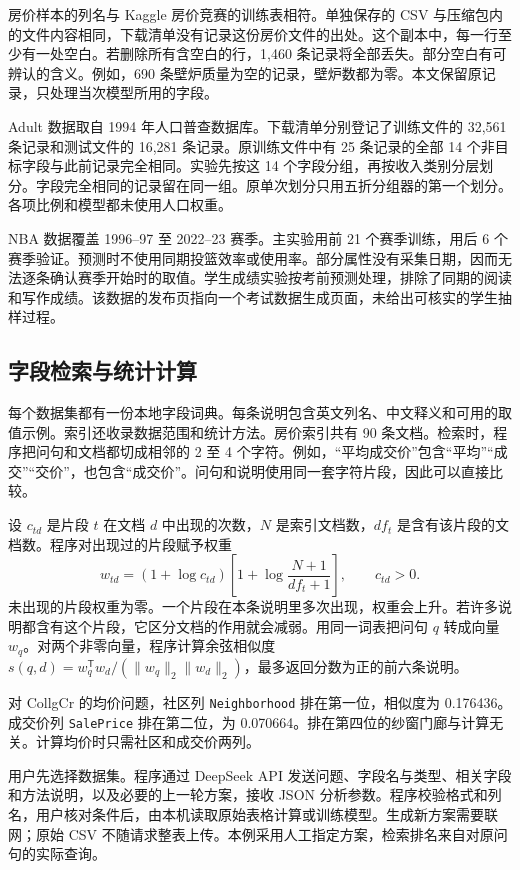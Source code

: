 \documentclass[12pt,journal,onecolumn,a4paper]{IEEEtran}
\newcommand{\field}[1]{\texttt{#1}}
\begin{document}
房价样本的列名与 Kaggle 房价竞赛的训练表相符\citep{house}。单独保存的 CSV 与压缩包内的文件内容相同，下载清单没有记录这份房价文件的出处。这个副本中，每一行至少有一处空白。若删除所有含空白的行，1,460 条记录将全部丢失。部分空白有可辨认的含义。例如，690 条壁炉质量为空的记录，壁炉数都为零。本文保留原记录，只处理当次模型所用的字段。

Adult 数据取自 1994 年人口普查数据库\citep{adult}。下载清单分别登记了训练文件的 32,561 条记录和测试文件的 16,281 条记录。原训练文件中有 25 条记录的全部 14 个非目标字段与此前记录完全相同。实验先按这 14 个字段分组，再按收入类别分层划分。字段完全相同的记录留在同一组。原单次划分只用五折分组器的第一个划分。各项比例和模型都未使用人口权重。

NBA 数据覆盖 1996--97 至 2022--23 赛季\citep{nba}。主实验用前 21 个赛季训练，用后 6 个赛季验证。预测时不使用同期投篮效率或使用率。部分属性没有采集日期，因而无法逐条确认赛季开始时的取值。学生成绩实验按考前预测处理，排除了同期的阅读和写作成绩。该数据的发布页指向一个考试数据生成页面，未给出可核实的学生抽样过程\citep{student}。



\subsection{字段检索与统计计算}
每个数据集都有一份本地字段词典。每条说明包含英文列名、中文释义和可用的取值示例。索引还收录数据范围和统计方法。房价索引共有 90 条文档。检索时，程序把问句和文档都切成相邻的 2 至 4 个字符。例如，“平均成交价”包含“平均”“成交”“交价”，也包含“成交价”。问句和说明使用同一套字符片段，因此可以直接比较。

设 $c_{td}$ 是片段 $t$ 在文档 $d$ 中出现的次数，$N$ 是索引文档数，$df_t$ 是含有该片段的文档数。程序对出现过的片段赋予权重
\begin{equation}\label{eq:tfidf}
w_{td}=(1+\log c_{td})\left[1+\log\frac{N+1}{df_t+1}\right],\qquad c_{td}>0.
\end{equation}
未出现的片段权重为零。一个片段在本条说明里多次出现，权重会上升。若许多说明都含有这个片段，它区分文档的作用就会减弱。用同一词表把问句 $q$ 转成向量 $w_q$。对两个非零向量，程序计算余弦相似度 $s(q,d)=w_q^{\mathsf T}w_d/(\lVert w_q\rVert_2\lVert w_d\rVert_2)$，最多返回分数为正的前六条说明。

对 CollgCr 的均价问题，社区列 \field{Neighborhood} 排在第一位，相似度为 0.176436。成交价列 \field{SalePrice} 排在第二位，为 0.070664。排在第四位的纱窗门廊与计算无关。计算均价时只需社区和成交价两列。

用户先选择数据集。程序通过 DeepSeek API 发送问题、字段名与类型、相关字段和方法说明，以及必要的上一轮方案，接收 JSON 分析参数。程序校验格式和列名，用户核对条件后，由本机读取原始表格计算或训练模型。生成新方案需要联网；原始 CSV 不随请求整表上传。本例采用人工指定方案，检索排名来自对原问句的实际查询。
\end{document}
